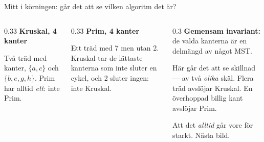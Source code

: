\begin{frame}{Mitt i körningen: går det att se vilken algoritm det är?}
\begin{columns}[T]
\begin{column}{0.33\textwidth}
\centering
{\small\bfseries\color{kthblue}Kruskal, 4 kanter}\par
\par
\footnotesize Två träd med kanter, $\{a,c\}$ och $\{b,e,g,h\}$. Prim har alltid \emph{ett}:
inte Prim.
\end{column}
\begin{column}{0.33\textwidth}
\centering
{\small\bfseries\color{kthblue}Prim, 4 kanter}\par
\par
\footnotesize Ett träd med 7 men utan 2. Kruskal tar de lättaste kanterna som inte sluter en
cykel, och 2 sluter ingen: inte Kruskal.
\end{column}
\begin{column}{0.3\textwidth}
\footnotesize
\textbf{Gemensam invariant:} de valda kanterna är en delmängd av något MST.\par\smallskip
Här går det att se skillnad — av två \emph{olika} skäl. Flera träd avslöjar Kruskal. En
överhoppad billig kant avslöjar Prim.\par\smallskip
Att det \emph{alltid} går vore för starkt. Nästa bild.
\end{column}
\end{columns}
\end{frame}


